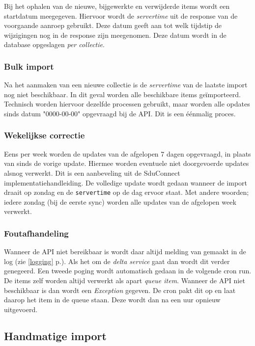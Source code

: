 \documentclass[12pt]{article}
\newcommand{\seeone}[1]{ (zie \ref{#1} p.\pageref{#1})}
\begin{document}
Bij het ophalen van de nieuwe, bijgewerkte en verwijderde items wordt een startdatum meegegeven. Hiervoor wordt de \emph{servertime} uit de response van de voorgaande aanroep gebruikt. Deze datum geeft aan tot welk tijdstip de wijzigingen nog in de response zijn meegenomen. Deze datum wordt in de database opgeslagen \emph{per collectie}.

\subsubsection{Bulk import}

Na het aanmaken van een nieuwe collectie is de \emph{servertime} van de laatste import nog niet beschikbaar. In dit geval worden alle beschikbare items ge\"{i}mporteerd. Technisch worden hiervoor dezelfde processen gebruikt, maar worden alle opdates sinds datum "0000-00-00" opgevraagd bij de API. Dit is een \'{e}\'{e}nmalig proces.

\subsubsection{Wekelijkse correctie}

Eens per week worden de updates van de afgelopen 7 dagen opgevraagd, in plaats van sinds de vorige update. Hiermee worden eventuele niet doorgevoerde updates alsnog verwerkt. Dit is een aanbeveling uit de SduConnect implementatiehandleiding.
De volledige update wordt gedaan wanneer de import draait op zondag en de \texttt{servertime} op de dag ervoor staat. Met andere woorden; iedere zondag (bij de eerste sync) worden alle updates van de afgelopen week verwerkt.

\subsubsection{Foutafhandeling}

Wanneer de API niet bereikbaar is wordt daar altijd melding van gemaakt in de log\seeone{logging}.
Als het om de \emph{delta service} gaat dan wordt dit verder genegeerd. Een tweede poging wordt automatisch gedaan in de volgende cron run.
De items zelf worden altijd verwerkt als apart \emph{queue item}. Wanneer de API niet beschikbaar is dan wordt een \emph{Exception} gegeven. De cron pakt dit op en laat daarop het item in de queue staan. Deze wordt dan na een uur opnieuw uitgevoerd.

\subsection{Handmatige import}
\end{document}
